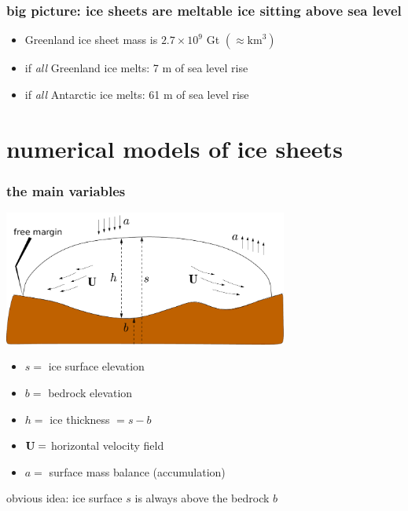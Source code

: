 \documentclass[hide notes,intlimits]{beamer}
\begin{document}
\begin{frame}
  \frametitle{big picture: ice sheets are meltable ice sitting above sea level}

\small
\begin{itemize}
\item Greenland ice sheet mass is $2.7 \times 10^9$ Gt \quad $(\approx \text{km}^3)$ %
\item if \emph{all} Greenland ice melts: 7 m of sea level rise
\item if \emph{all} Antarctic ice melts: 61 m of sea level rise
\end{itemize}
\end{frame}



\section[numerical models]{numerical models of ice sheets}


\begin{frame}
  \frametitle{the main variables}

\begin{center}
\includegraphics[width=0.7\textwidth]{groundedscheme}
\end{center}

\begin{itemize}
\small
\item $s=$ ice surface elevation
\item $b=$ bedrock elevation
\item $h=$ ice thickness $ = s-b$
\item ${\bf U}=$ horizontal velocity field
\item $a=$ surface mass balance (accumulation)
\end{itemize}

\begin{alertblock}{obvious idea: ice surface $s$ is always above the bedrock $b$}
\end{alertblock}
\end{frame}
\end{document}
